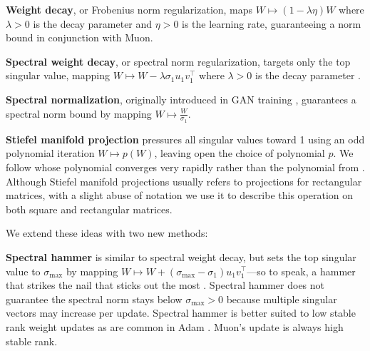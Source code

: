 \textbf{Weight decay}, or Frobenius norm regularization, maps $W \mapsto (1 - \lambda \eta)W$ where $\lambda > 0$ is the decay parameter and $\eta > 0$ is the learning rate, guaranteeing a norm bound in conjunction with Muon.

\textbf{Spectral weight decay}, or spectral norm regularization, targets only the top singular value, mapping $W \mapsto W - \lambda \sigma_1 u_1 v_1^\top$ where $\lambda > 0$ is the decay parameter \citep{yoshida2017spectralnormregularizationimproving,kexuefm-spectral-weight-decay}.

\textbf{Spectral normalization}, originally introduced in GAN training \citep{miyato2018spectralnormalizationgenerativeadversarial}, guarantees a spectral norm bound by mapping $W \mapsto \tfrac{W}{\sigma_1}$.

\textbf{Stiefel manifold projection} pressures all singular values toward 1 using an odd polynomial iteration $W \mapsto p(W)$, leaving open the choice of polynomial $p$. We follow \citet{You2025} whose polynomial converges very rapidly rather than the polynomial from \citep{cisse2017parseval}. Although Stiefel manifold projections usually refers to projections for rectangular matrices, with a slight abuse of notation we use it to describe this operation on both square and rectangular matrices.

\vspace{1em}

We extend these ideas with two new methods:

\vspace{1em}

\textbf{Spectral hammer} is similar to spectral weight decay, but sets the top singular value to $\sigma_\text{max}$ by mapping $W \mapsto W + (\sigma_\text{max} - \sigma_1)u_1v_1^\top$---so to speak, a hammer that strikes the nail that sticks out the most \citep{hess2023frobenius}. Spectral hammer does not guarantee the spectral norm stays below $\sigma_\text{max} > 0$ because multiple singular vectors may increase per update. Spectral hammer is better suited to low stable rank weight updates as are common in Adam \citep{zhao2024adapproxadaptiveapproximationadam}. Muon's update is always high stable rank.


